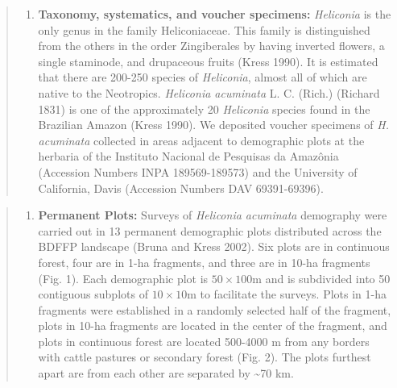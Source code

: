 \documentclass[
  12pt,
  man, donotrepeattitle]{apa6}
\providecommand{\tightlist}{%
  \setlength{\itemsep}{0pt}\setlength{\parskip}{0pt}}
\begin{document}
\begin{quote}
\begin{enumerate}
\def\labelenumi{\alph{enumi}.}
\setcounter{enumi}{1}
\tightlist
\item
  \textbf{Taxonomy, systematics, and voucher specimens:} \emph{Heliconia} is the only genus in the family Heliconiaceae. This family is distinguished from the others in the order Zingiberales by having inverted flowers, a single staminode, and drupaceous fruits (Kress 1990). It is estimated that there are 200-250 species of \emph{Heliconia}, almost all of which are native to the Neotropics. \emph{Heliconia acuminata} L. C. (Rich.) (Richard 1831) is one of the approximately 20 \emph{Heliconia} species found in the Brazilian Amazon (Kress 1990). We deposited voucher specimens of \emph{H. acuminata} collected in areas adjacent to demographic plots at the herbaria of the Instituto Nacional de Pesquisas da Amazônia (Accession Numbers INPA 189569-189573) and the University of California, Davis (Accession Numbers DAV 69391-69396).
\end{enumerate}
\end{quote}

\begin{quote}
\begin{enumerate}
\def\labelenumi{\alph{enumi}.}
\setcounter{enumi}{2}
\tightlist
\item
  \textbf{Permanent Plots:} Surveys of \emph{Heliconia acuminata} demography were carried out in 13 permanent demographic plots distributed across the BDFFP landscape (Bruna and Kress 2002). Six plots are in continuous forest, four are in 1-ha fragments, and three are in 10-ha fragments (Fig. 1). Each demographic plot is \(50\times100\)m and is subdivided into 50 contiguous subplots of \(10\times10\)m to facilitate the surveys. Plots in 1-ha fragments were established in a randomly selected half of the fragment, plots in 10-ha fragments are located in the center of the fragment, and plots in continuous forest are located 500-4000 m from any borders with cattle pastures or secondary forest (Fig. 2). The plots furthest apart are from each other are separated by \textasciitilde70 km.
\end{enumerate}
\end{quote}
\end{document}
